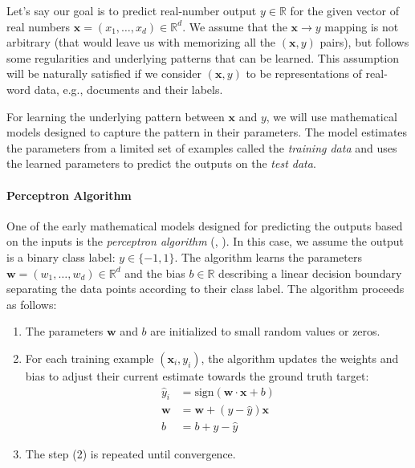 Let's say our goal is to predict real-number output $y \in \mathbb{R}$ for the given vector of real numbers $\mathbf{x} = (x_1, \ldots, x_d) \in \mathbb{R}^d$.
We assume that the $\mathbf{x} \rightarrow y$ mapping is not arbitrary (that would leave us with memorizing all the $(\mathbf{x},y)$ pairs), but follows some regularities and underlying patterns that can be learned. This assumption will be naturally satisfied if we consider $(\mathbf{x},y)$ to be representations of real-word data, e.g., documents and their labels.

For learning the underlying pattern between $\mathbf{x}$ and $y$, we will use mathematical models designed to capture the pattern in their parameters. The model estimates the parameters from a limited set of examples called the \textit{training data} and uses the learned parameters to predict the outputs on the \textit{test data}.

\paragraph{Perceptron Algorithm} One of the early mathematical models designed for predicting the outputs based on the inputs is the \emph{perceptron algorithm} (\citealp{rosenblatt1958perceptron}, \citealp[p.~192]{bishop2006pattern}). In this case, we assume the output is a binary class label: $y \in \{-1, 1\}$. The algorithm learns the parameters $\textbf{w} = (w_1, \ldots, w_d) \in \mathbb{R}^d$ and the bias $b \in \mathbb{R}$ describing a linear decision boundary separating the data points according to their class label. The algorithm proceeds as follows:


\begin{enumerate}
    \item The parameters $\textbf{w}$ and $b$ are initialized to small random values or zeros.
    \item For each training example $(\mathbf{x}_i, y_i)$, the algorithm updates the weights and bias to adjust their current estimate towards the ground truth target:
          \begin{align} \label{eq:perceptron1}
              \hat{y}_i  & = \text{sign}(\textbf{w} \cdot \mathbf{x} + b) \\
              \textbf{w} & = \textbf{w} + (y - \hat{y}) \textbf{x}        \\
              b          & = b + y - \hat{y}
          \end{align}
    \item The step (2) is repeated until convergence.
\end{enumerate}

